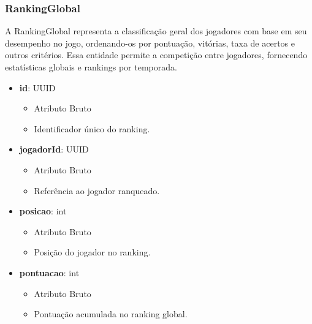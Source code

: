     \subsubsection{RankingGlobal}
    A RankingGlobal representa a classificação geral dos jogadores com base em seu desempenho no jogo, ordenando-os por pontuação, vitórias, taxa de acertos e outros critérios. Essa entidade permite a competição entre jogadores, fornecendo estatísticas globais e rankings por temporada.
    \begin{itemize}
        \item \textbf{id}: UUID  
              \begin{itemize}
                  \item Atributo Bruto
                  \item Identificador único do ranking.
              \end{itemize}
    
        \item \textbf{jogadorId}: UUID  
              \begin{itemize}
                  \item Atributo Bruto
                  \item Referência ao jogador ranqueado.
              \end{itemize}
    
        \item \textbf{posicao}: int  
              \begin{itemize}
                  \item Atributo Bruto
                  \item Posição do jogador no ranking.
              \end{itemize}
    
        \item \textbf{pontuacao}: int  
              \begin{itemize}
                  \item Atributo Bruto
                  \item Pontuação acumulada no ranking global.
              \end{itemize}
    

\end{itemize}
